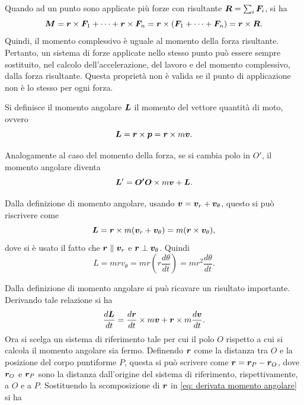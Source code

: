 Quando ad un punto sono applicate più forze con risultante $\bm{R}=\sum_i\bm{F}_i$, si ha
\begin{equation}
    \bm{M}=\bm{r}\times\bm{F}_1+\cdots+\bm{r}\times\bm{F}_n=\bm{r}\times(\bm{F}_1+\cdots+\bm{F}_n)=\bm{r}\times\bm{R}.
\end{equation}  
Quindi, il momento complessivo è uguale al momento della forza risultante. Pertanto, un sistema di forze applicate nello stesso punto può essere sempre sostituito, nel calcolo dell'accelerazione, del lavoro e del momento complessivo, dalla forza risultante. Questa proprietà non è valida se il punto di applicazione non è lo stesso per ogni forza.
\begin{defn}
    Si definisce il momento angolare $\bm{L}$ il momento del vettore quantità di moto, ovvero
    \begin{equation}
        \bm{L}=\bm{r}\times\bm{p}=\bm{r}\times m\bm{v}.
    \end{equation}
\end{defn}
Analogamente al caso del momento della forza, se si cambia polo in $O'$, il momento angolare diventa
\begin{equation}
    \bm{L}'=\bm{O'O}\times m\bm{v}+\bm{L}.
\end{equation}
\begin{obs}
    Dalla definizione di momento angolare, usando  $\bm{v}=\bm{v}_r+\bm{v}_\theta$, questo si può riscrivere come
\begin{equation}
    \bm{L}=\bm{r}\times m(\bm{v}_r+\bm{v}_\theta)=m(\bm{r}\times \bm{v}_\theta),
\end{equation}
dove si è usato il fatto che $\bm{r}\parallel\bm{v}_r$ e $\bm{r}\perp\bm{v}_\theta$. Quindi
\begin{equation}
    L=mrv_\theta=mr(r\frac{d\theta}{dt})=mr^2\frac{d\theta}{dt}.
\end{equation}
\end{obs}
Dalla definizione di momento angolare si può ricavare un risultato importante. Derivando tale relazione si ha
\begin{equation}
\label{eq: derivata momento angolare}
    \frac{d\bm{L}}{dt}=\frac{d\bm{r}}{dt}\times m\bm{v}+\bm{r}\times m\frac{d\bm{v}}{dt}.
\end{equation}
Ora si scelga un sistema di riferimento tale per cui il polo $O$ rispetto a cui si calcola il momento angolare sia fermo. Definendo $\bm{r}$ come la distanza tra $O$ e la posizione del corpo puntiforme $P$, questa si può scrivere come $\bm{r}=\bm{r}_P-\bm{r}_O$, dove $\bm{r}_O$ e $\bm{r}_P$  sono la distanza dall'origine del sistema di riferimento, rispettivamente, a $O$ e a $P$. Sostituendo la scomposizione di $\bm{r}$ in \eqref{eq: derivata momento angolare} si ha
